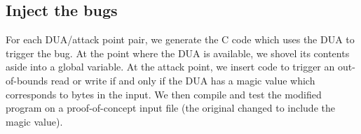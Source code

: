 \subsection{Inject the bugs}
For each DUA/attack point pair, we generate the C code which uses the DUA to trigger the bug.
At the point where the DUA is available, we shovel its contents aside into a global variable.
At the attack point, we insert code to trigger an out-of-bounds read or write if and only if the DUA has a magic value which corresponds to bytes in the input.
We then compile and test the modified program on a proof-of-concept input file (the original changed to include the magic value).
